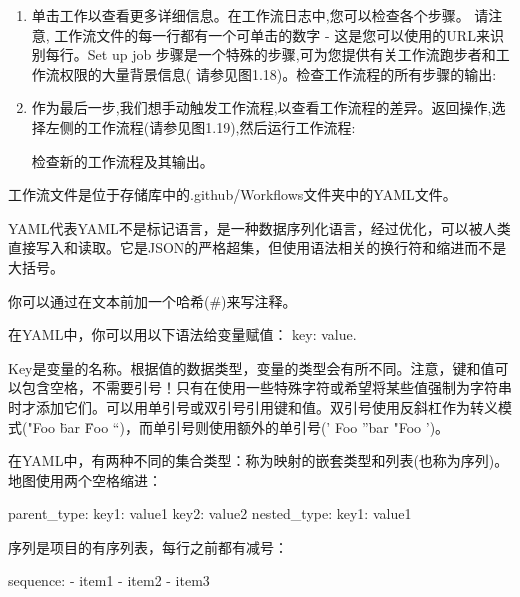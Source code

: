 \begin{enumerate}
\item 
单击工作以查看更多详细信息。在工作流日志中,您可以检查各个步骤。 请注意, 工作流文件的每一行都有一个可单击的数字 - 这是您可以使用的URL来识别每行。Set up job 步骤是一个特殊的步骤,可为您提供有关工作流跑步者和工作流权限的大量背景信息( 请参见图1.18)。检查工作流程的所有步骤的输出:


\item 
作为最后一步,我们想手动触发工作流程,以查看工作流程的差异。返回操作,选择左侧的工作流程(请参见图1.19),然后运行工作流程:


检查新的工作流程及其输出。

\end{enumerate}


工作流文件是位于存储库中的.github/Workflows文件夹中的YAML文件。


YAML代表YAML不是标记语言，是一种数据序列化语言，经过优化，可以被人类直接写入和读取。它是JSON的严格超集，但使用语法相关的换行符和缩进而不是大括号。

你可以通过在文本前加一个哈希(\#)来写注释。

在YAML中，你可以用以下语法给变量赋值： key: value.

Key是变量的名称。根据值的数据类型，变量的类型会有所不同。注意，键和值可以包含空格，不需要引号！只有在使用一些特殊字符或希望将某些值强制为字符串时才添加它们。可以用单引号或双引号引用键和值。双引号使用反斜杠作为转义模式("Foo \"bar \" Foo “)，而单引号则使用额外的单引号(' Foo ”bar "Foo ')。


在YAML中，有两种不同的集合类型：称为映射的嵌套类型和列表(也称为序列)。地图使用两个空格缩进：

\begin{shell}
parent_type:
  key1: value1
  key2: value2
  nested_type:
    key1: value1
\end{shell}

序列是项目的有序列表，每行之前都有减号：

\begin{shell}
sequence:
  - item1
  - item2
  - item3
\end{shell}

